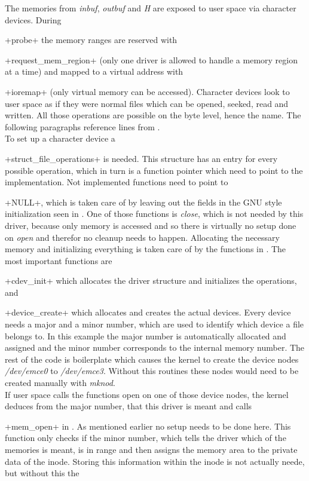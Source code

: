 \documentclass[12pt,a4paper,parskip=full,abstract=true,BCOR=12mm,twoside,open=right]{scrreprt}
\newcommand*{\SavedLstInline}{}
\DeclareRobustCommand*{\lstinline}{%
  \ifmmode
    \let\SavedBGroup\bgroup
    \def\bgroup{%
      \let\bgroup\SavedBGroup
      \hbox\bgroup
    }%
  \fi
  \SavedLstInline
}
\def\device#1{\textit{#1}}
\begin{document}
The memories from \device{inbuf}, \device{outbuf} and \device{H} are exposed
to user space via character devices\cite{ldd}. During
\lstinline+probe+ the memory ranges are reserved with
\lstinline+request_mem_region+\cite{ldd} (only one driver is allowed
to handle a memory region at a time) and mapped to a virtual address with
\lstinline+ioremap+\cite{ldd} (only virtual memory can be accessed).
Character devices look to user space as if they were normal files which can
be opened, seeked, read and written. All those operations are possible on
the byte level, hence the name. The following paragraphs reference lines from
.\\
To set up a character device a
\lstinline+struct_file_operations+\cite{ldd} is needed. This structure
has an entry for every possible operation, which in turn is a function pointer
which need to point to the implementation. Not implemented functions need to
point to \lstinline+NULL+, which is taken care of by leaving out the fields
in the GNU style initialization seen in . One of those functions
is \emph{close}, which is not needed by this driver, because only memory is
accessed and so there is virtually no setup done on \emph{open} and therefor
no cleanup needs to happen. Allocating the necessary
memory and initializing everything is taken care of by the functions in
. The most important functions are
\lstinline+cdev_init+\cite{ldd} which allocates the driver structure
and initializes the operations, and \lstinline+device_create+ which allocates
and creates the actual devices. Every device needs a major and a minor number,
which are used to identify which device a file belongs to. In this example the
major number is automatically allocated and assigned and the minor number
corresponds to the internal memory number. The rest of the code is boilerplate
which causes the kernel to create the device nodes \emph{/dev/emce0} to
\emph{/dev/emce3}. Without this routines these nodes would need to be created
manually with \emph{mknod}.\\
If user space calls the functions open on one of those device nodes, the
kernel deduces from the major number, that this driver is meant and calls
\lstinline+mem_open+ in . As mentioned earlier no setup needs
to be done here. This function only checks if the minor number, which tells
the driver which of the memories is meant, is in range and then assigns the
memory area to the private data of the inode\cite{ldd}. Storing this
information within the inode is not actually neede, but without this the
\end{document}

